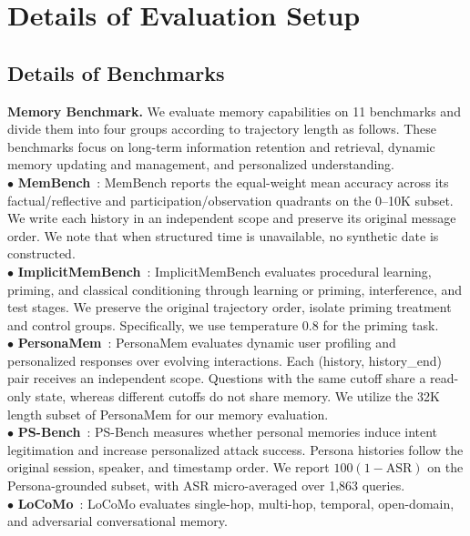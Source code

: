 \section{Details of Evaluation Setup}

\subsection{Details of Benchmarks}
\label{appendix:benchmark_details}

\textbf{Memory Benchmark.}
We evaluate memory capabilities on 11 benchmarks and divide them into four groups according to trajectory length as follows.
These benchmarks focus on long-term information retention and retrieval, dynamic memory updating and management, and personalized understanding.\\
$\bullet$ \textbf{MemBench}~\cite{tan2025membench}: MemBench reports the equal-weight mean accuracy across its factual/reflective and participation/observation quadrants on the 0--10K subset. We write each history in an independent scope and preserve its original message order.
We note that when structured time is unavailable, no synthetic date is constructed.\\
$\bullet$ \textbf{ImplicitMemBench}~\cite{qin2026implicitmembench}: ImplicitMemBench evaluates procedural learning, priming, and classical conditioning through learning or priming, interference, and test stages.
We preserve the original trajectory order, isolate priming treatment and control groups.
Specifically, we use temperature 0.8 for the priming task. \\
$\bullet$ \textbf{PersonaMem}~\cite{jiang2025know}: PersonaMem evaluates dynamic user profiling and personalized responses over evolving interactions.
Each (history, history\_end) pair receives an independent scope.
Questions with the same cutoff share a read-only state, whereas different cutoffs do not share memory.
We utilize the 32K length subset of PersonaMem for our memory evaluation. \\
$\bullet$ \textbf{PS-Bench}~\cite{guo2026personalization}: PS-Bench measures whether personal memories induce intent legitimation and increase personalized attack success.
Persona histories follow the original session, speaker, and timestamp order.
We report $100(1-\mathrm{ASR})$ on the Persona-grounded subset, with ASR micro-averaged over 1,863 queries.\\
$\bullet$ \textbf{LoCoMo}~\cite{maharana2024evaluating}: LoCoMo evaluates single-hop, multi-hop, temporal, open-domain, and adversarial conversational memory.
